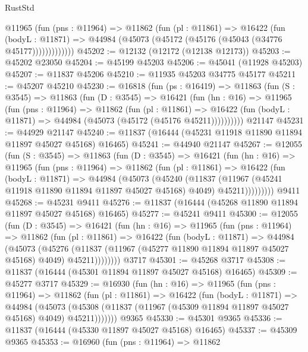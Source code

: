 \begin{lexlean}{RustStd}
\begin{coremodule}
            @11965
              (fun (pns : @11964) =>
              @11862
                (fun (pl : @11861) =>
                @16422
                  (fun (bodyL : @11871) =>
                  @44984 (@45073 (@45172 (@45176 (@45043 (@34776 @45177)))))))))))))
@45202 := @12132 (@12172 (@12138 @12173))
@45203 := @45202 @23050
@45204 := @45199 @45203
@45206 := @45041 (@11928 @45203)
@45207 := @11837 @45206
@45210 := @11935 @45203 @34775 @45177
@45211 := @45207 @45210
@45230 := @16818
    (fun (ps : @16419) =>
    @11863
      (fun (S : @3545) =>
      @11863
        (fun (D : @3545) =>
        @16421
          (fun (hn : @16) =>
          @11965
            (fun (pns : @11964) =>
            @11862
              (fun (pl : @11861) =>
              @16422 (fun (bodyL : @11871) => @44984 (@45073 (@45172 (@45176 @45211))))))))))
    @21147
@45231 := @44929 @21147
@45240 := @11837 (@16444 (@45231 @11918 @11890 @11894 @11897 @45027 @45168) @16465)
@45241 := @44940 @21147
@45267 := @12055
    (fun (S : @3545) =>
    @11863
      (fun (D : @3545) =>
      @16421
        (fun (hn : @16) =>
        @11965
          (fun (pns : @11964) =>
          @11862
            (fun (pl : @11861) =>
            @16422
              (fun (bodyL : @11871) =>
              @44984
                (@45073
                  (@45240
                    (@11837
                      (@11967 (@45241 @11918 @11890 @11894 @11897 @45027 @45168) @4049)
                      @45211)))))))))
    @9411
@45268 := @45231 @9411
@45276 := @11837 (@16444 (@45268 @11890 @11894 @11897 @45027 @45168) @16465)
@45277 := @45241 @9411
@45300 := @12055
    (fun (D : @3545) =>
    @16421
      (fun (hn : @16) =>
      @11965
        (fun (pns : @11964) =>
        @11862
          (fun (pl : @11861) =>
          @16422
            (fun (bodyL : @11871) =>
            @44984
              (@45073
                (@45276
                  (@11837 (@11967 (@45277 @11890 @11894 @11897 @45027 @45168) @4049) @45211))))))))
    @3717
@45301 := @45268 @3717
@45308 := @11837 (@16444 (@45301 @11894 @11897 @45027 @45168) @16465)
@45309 := @45277 @3717
@45329 := @16930
    (fun (hn : @16) =>
    @11965
      (fun (pns : @11964) =>
      @11862
        (fun (pl : @11861) =>
        @16422
          (fun (bodyL : @11871) =>
          @44984
            (@45073
              (@45308 (@11837 (@11967 (@45309 @11894 @11897 @45027 @45168) @4049) @45211)))))))
    @9365
@45330 := @45301 @9365
@45336 := @11837 (@16444 (@45330 @11897 @45027 @45168) @16465)
@45337 := @45309 @9365
@45353 := @16960
    (fun (pns : @11964) =>
    @11862

\end{coremodule}
\end{lexlean}

